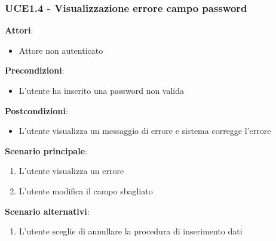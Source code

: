 \subsubsection{UCE1.4 - Visualizzazione errore campo password}
\textbf{Attori}:
\begin{itemize}
    \item Attore non autenticato
\end{itemize}
\textbf{Precondizioni}:
\begin{itemize}
    \item L'utente ha inserito una password non valida
\end{itemize}
\textbf{Postcondizioni}:
\begin{itemize}
    \item L'utente visualizza un messaggio di errore e sistema corregge l'errore
\end{itemize}
\textbf{Scenario principale}:
\begin{enumerate}
    \item L'utente visualizza un errore 
    \item L'utente modifica il campo sbagliato
\end{enumerate}
\textbf{Scenario alternativi}:
\begin{enumerate}
    \item L'utente sceglie di annullare la procedura di inserimento dati
\end{enumerate}